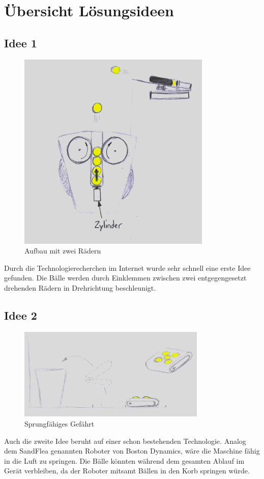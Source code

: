 \clearpage
\section{Übersicht Lösungsideen}
\subsection{Idee 1}
\begin{figure}[h!]
	\centering
	\includegraphics[scale=0.75]{../../fig/Wurfmaschine_Drehraeder.png}
	\caption{Aufbau mit zwei Rädern}
	\label{fig:konzept1}
\end{figure}
Durch die Technologierecherchen im Internet wurde sehr schnell eine erste Idee gefunden. Die Bälle werden durch Einklemmen zwischen zwei entgegengesetzt drehenden Rädern in Drehrichtung beschleunigt.

\subsection{Idee 2}
\begin{figure}[h!]
	\centering
	\includegraphics[width=0.8\textwidth]{../../fig/Springer.jpg}
	\caption{Sprungfähiges Gefährt}
	\label{fig:springer}
\end{figure}
Auch die zweite Idee beruht auf einer schon bestehenden Technologie. Analog dem SandFlea
\cite{sandflea} genannten Roboter von Boston Dynamics, wäre die Maschine fähig in die 
Luft zu springen. Die Bälle könnten während dem gesamten Ablauf im Gerät verbleiben, da 
der Roboter mitsamt Bällen in den Korb springen würde.

